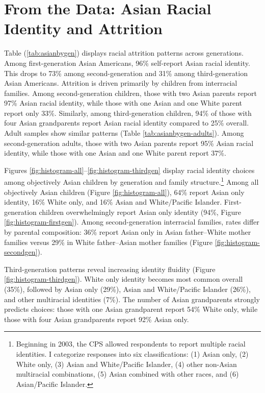 \section{From the Data: Asian Racial Identity and Attrition}\label{sec:attrition}

Table (\ref{tab:asianbygen}) displays racial attrition patterns across generations. Among first-generation Asian Americans, 96\% self-report Asian racial identity. This drops to 73\% among second-generation and 31\% among third-generation Asian Americans. Attrition is driven primarily by children from interracial families. Among second-generation children, those with two Asian parents report 97\% Asian racial identity, while those with one Asian and one White parent report only 33\%. Similarly, among third-generation children, 94\% of those with four Asian grandparents report Asian racial identity compared to 25\% overall. Adult samples show similar patterns (Table \ref{tab:asianbygen-adults}). Among second-generation adults, those with two Asian parents report 95\% Asian racial identity, while those with one Asian and one White parent report 37\%.

Figures \ref{fig:histogram-all}--\ref{fig:histogram-thirdgen} display racial identity choices among objectively Asian children by generation and family structure.\footnote{Beginning in 2003, the CPS allowed respondents to report multiple racial identities. I categorize responses into six classifications: (1) Asian only, (2) White only, (3) Asian and White/Pacific Islander, (4) other non-Asian multiracial combinations, (5) Asian combined with other races, and (6) Asian/Pacific Islander.} Among all objectively Asian children (Figure \ref{fig:histogram-all}), 64\% report Asian only identity, 16\% White only, and 16\% Asian and White/Pacific Islander. First-generation children overwhelmingly report Asian only identity (94\%, Figure \ref{fig:histogram-firstgen}). Among second-generation interracial families, rates differ by parental composition: 36\% report Asian only in Asian father--White mother families versus 29\% in White father--Asian mother families (Figure \ref{fig:histogram-secondgen}).

Third-generation patterns reveal increasing identity fluidity (Figure \ref{fig:histogram-thirdgen}). White only identity becomes most common overall (35\%), followed by Asian only (29\%), Asian and White/Pacific Islander (26\%), and other multiracial identities (7\%). The number of Asian grandparents strongly predicts choices: those with one Asian grandparent report 54\% White only, while those with four Asian grandparents report 92\% Asian only.

